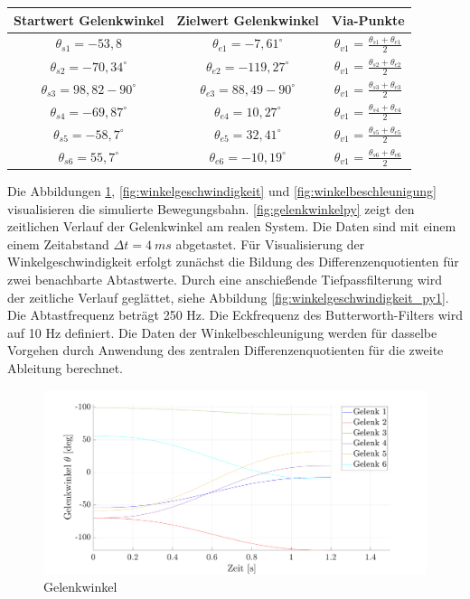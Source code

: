 %
\begin{tabular}{|c|c|c|}
	\hline
	Startwert Gelenkwinkel&  Zielwert Gelenkwinkel&  Via-Punkte\\
	\hline
	$\theta_{s1} = -53,8$&  $\theta_{e1} = -7,61^{\circ}$  &$\theta_{v1}$ = $\tfrac{\theta_{s1}+\theta_{e1}}{2}$  \\
	\hline
	$\theta_{s2} = -70,34^{\circ}$&  $\theta_{e2} = -119,27^{\circ}$    &$\theta_{v1}$ = $\tfrac{\theta_{s2}+\theta_{e2}}{2}$  \\
	\hline
	$\theta_{s3} = 98,82-90^{\circ}$&  $\theta_{e3} = 88,49-90^{\circ}$&$\theta_{v1}$ = $\tfrac{\theta_{s3}+\theta_{e3}}{2}$  \\
	\hline
	$\theta_{s4} = -69,87^{\circ}$&  $\theta_{e4} = 10,27^{\circ}$&$\theta_{v1}$ = $\tfrac{\theta_{s4}+\theta_{e4}}{2}$  \\
	\hline
	$\theta_{s5} = -58,7^{\circ}$&  $\theta_{e5} = 32,41^{\circ}$  &$\theta_{v1}$ = $\tfrac{\theta_{s5}+\theta_{e5}}{2}$  \\
	\hline
	$\theta_{s6} = 55,7^{\circ}$&  $\theta_{e6} = -10,19^{\circ}$&$\theta_{v1}$ = $\tfrac{\theta_{s6}+\theta_{e6}}{2}$  \\
	\hline
\end{tabular}
Die Abbildungen \ref{fig:gelenkwinkel}, \ref{fig:winkelgeschwindigkeit} und  \ref{fig:winkelbeschleunigung}  visualisieren die simulierte Bewegungsbahn. \ref{fig:gelenkwinkelpy} zeigt den zeitlichen Verlauf der Gelenkwinkel am realen System. Die Daten sind mit einem einem  Zeitabstand $\Delta t = 4~ms$ abgetastet. Für Visualisierung der Winkelgeschwindigkeit  erfolgt zunächst die Bildung des Differenzenquotienten für zwei benachbarte Abtastwerte. Durch eine anschießende Tiefpassfilterung wird der zeitliche Verlauf geglättet, siehe Abbildung \ref{fig:winkelgeschwindigkeit_py1}. Die Abtastfrequenz beträgt 250 Hz. Die Eckfrequenz des Butterworth-Filters wird auf 10 Hz definiert. Die Daten der Winkelbeschleunigung werden für dasselbe Vorgehen durch Anwendung des zentralen Differenzenquotienten für die zweite Ableitung berechnet.
%
\newpage
\begin{figure}[]
	\centering
	\includegraphics[width=1\linewidth]{images/gelenkwinkel}
	\caption{Gelenkwinkel}
	\label{fig:gelenkwinkel}
\end{figure}
